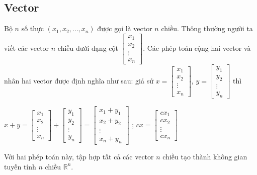\documentclass[12pt,a4paper]{report}
\begin{document}
	\subsection{Vector}
	Bộ $n$ số thực $(x_1, x_2, ..., x_n)$ được gọi là vector $n$ chiều. Thông thường người ta viết các vector $n$ chiều dưới dạng cột
	$ \begin{bmatrix}
		x_1\\x_2\\\vdots\\x_n
	\end{bmatrix}$. Các phép toán cộng hai vector và nhân hai vector được định nghĩa như sau: giả sử $x = \begin{bmatrix}
		x_1\\x_2 \\\vdots \\x_n
	\end{bmatrix}$, $y = \begin{bmatrix}
		y_1\\y_2 \\\vdots \\y_n
	\end{bmatrix}$ thì \begin{center}
		$x + y = \begin{bmatrix}
			x_1\\x_2\\\vdots\\x_n
		\end{bmatrix} + \begin{bmatrix}
			y_1\\y_2\\\vdots\\ y_n
		\end{bmatrix} = \begin{bmatrix}
			x_1+y_1\\x_2 + y_2\\\vdots\\x_n + y_n
		\end{bmatrix}$ ; $cx = \begin{bmatrix}
			cx_1\\cx_2\\\vdots\\cx_n
		\end{bmatrix}$
	\end{center} 
	Với hai phép toán này, tập hợp tất cả các vector $n$ chiều tạo thành không gian tuyến tính $n$ chiều $\mathbb{R}^n$.
\end{document}

